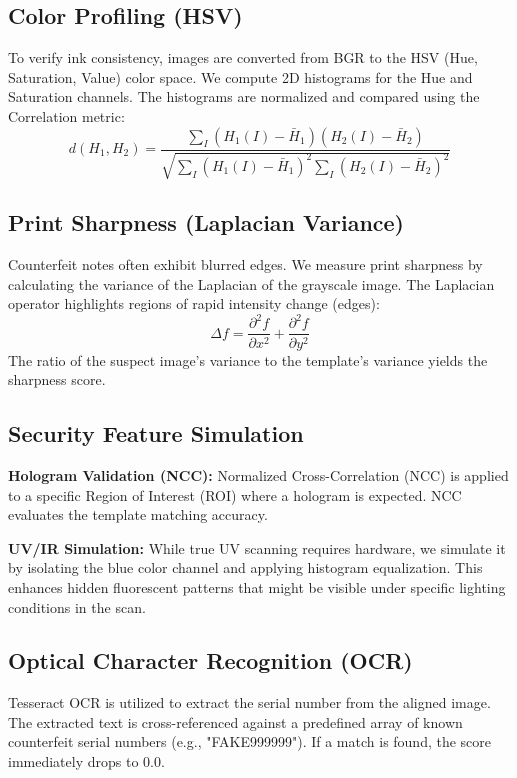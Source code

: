 \documentclass[12pt,a4paper]{article}
\begin{document}
\subsection{Color Profiling (HSV)}
To verify ink consistency, images are converted from BGR to the HSV (Hue, Saturation, Value) color space. We compute 2D histograms for the Hue and Saturation channels. The histograms are normalized and compared using the Correlation metric:
\begin{equation}
d(H_1, H_2) = \frac{\sum_I (H_1(I) - \bar{H}_1)(H_2(I) - \bar{H}_2)}{\sqrt{\sum_I (H_1(I) - \bar{H}_1)^2 \sum_I (H_2(I) - \bar{H}_2)^2}}
\end{equation}

\subsection{Print Sharpness (Laplacian Variance)}
Counterfeit notes often exhibit blurred edges. We measure print sharpness by calculating the variance of the Laplacian of the grayscale image. The Laplacian operator highlights regions of rapid intensity change (edges):
\begin{equation}
\Delta f = \frac{\partial^2 f}{\partial x^2} + \frac{\partial^2 f}{\partial y^2}
\end{equation}
The ratio of the suspect image's variance to the template's variance yields the sharpness score.

\subsection{Security Feature Simulation}
\textbf{Hologram Validation (NCC):} Normalized Cross-Correlation (NCC) is applied to a specific Region of Interest (ROI) where a hologram is expected. NCC evaluates the template matching accuracy.

\textbf{UV/IR Simulation:} While true UV scanning requires hardware, we simulate it by isolating the blue color channel and applying histogram equalization. This enhances hidden fluorescent patterns that might be visible under specific lighting conditions in the scan.

\subsection{Optical Character Recognition (OCR)}
Tesseract OCR is utilized to extract the serial number from the aligned image. The extracted text is cross-referenced against a predefined array of known counterfeit serial numbers (e.g., "FAKE999999"). If a match is found, the score immediately drops to 0.0.
\end{document}
